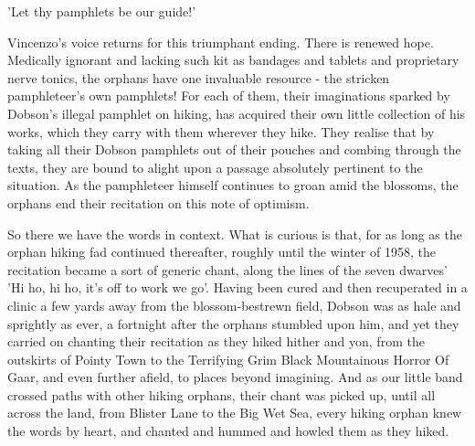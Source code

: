 'Let thy pamphlets be our guide!'

Vincenzo's voice returns for this triumphant ending. There is renewed hope. Medically ignorant and lacking such kit as bandages and tablets and proprietary nerve tonics, the orphans have one invaluable resource - the stricken pamphleteer's own pamphlets! For each of them, their imaginations sparked by Dobson's illegal pamphlet on hiking, has acquired their own little collection of his works, which they carry with them wherever they hike. They realise that by taking all their Dobson pamphlets out of their pouches and combing through the texts, they are bound to alight upon a passage absolutely pertinent to the situation. As the pamphleteer himself continues to groan amid the blossoms, the orphans end their recitation on this note of optimism.

So there we have the words in context. What is curious is that, for as long as the orphan hiking fad continued thereafter, roughly until the winter of 1958, the recitation became a sort of generic chant, along the lines of the seven dwarves' 'Hi ho, hi ho, it's off to work we go'. Having been cured and then recuperated in a clinic a few yards away from the blossom-bestrewn field, Dobson was as hale and sprightly as ever, a fortnight after the orphans stumbled upon him, and yet they carried on chanting their recitation as they hiked hither and yon, from the outskirts of Pointy Town to the Terrifying Grim Black Mountainous Horror Of Gaar, and even further afield, to places beyond imagining. And as our little band crossed paths with other hiking orphans, their chant was picked up, until all across the land, from Blister Lane to the Big Wet Sea, every hiking orphan knew the words by heart, and chanted and hummed and howled them as they hiked.